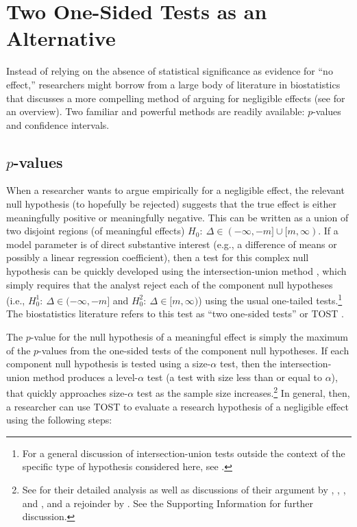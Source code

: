 \documentclass[12pt]{article}
\begin{document}
\section*{Two One-Sided Tests as an Alternative}

Instead of relying on the absence of statistical significance as evidence for ``no effect,'' researchers might borrow from a large body of literature in biostatistics that discusses a more compelling method of arguing for negligible effects (see \citealt{Wellek2010} for an overview). Two familiar and powerful methods are readily available: $p$-values and confidence intervals.

\subsection*{$p$-values}

When a researcher wants to argue empirically for a negligible effect, the relevant null hypothesis (to hopefully be rejected) suggests that the true effect is either meaningfully positive or meaningfully negative. This can be written as a union of two disjoint regions (of meaningful effects) $H_0:~\Delta \in (-\infty, -m] \cup [m, \infty)$. If a model parameter is of direct substantive interest (e.g., a difference of means or possibly a linear regression coefficient), then a test for this complex null hypothesis can be quickly developed using the intersection-union method \citep{Schuirmann1987, BergerHsu1996, Wellek2010}, which simply requires that the analyst reject each of the component null hypotheses (i.e., $H^1_0:~\Delta \in (-\infty, -m]$ and $H^2_0:~\Delta \in [m, \infty)$) using the usual one-tailed tests.\footnote{For a general discussion of intersection-union tests outside the context of the specific type of hypothesis considered here, see \citet[esp. pp. 380-382]{CasellaBerger2002}.} The biostatistics literature refers to this test as ``two one-sided tests'' or TOST \citep{Schuirmann1987, BergerHsu1996}.

The $p$-value for the null hypothesis of a meaningful effect is simply the maximum of the $p$-values from the one-sided tests of the component null hypotheses.  If each component null hypothesis is tested using a size-$\alpha$ test, then the intersection-union method produces a level-$\alpha$ test (a test with size less than or equal to $\alpha$), that quickly approaches size-$\alpha$ test as the sample size increases.\footnote{See \cite{BergerHsu1996} for their detailed analysis as well as discussions of their argument by \cite{MeredithHeise1996}, \cite{LiuChow1996}, \cite{Schuirmann1996}, and \cite{Hwang1996}, and a rejoinder by \cite{BergerHsu1996b}. See the Supporting Information for further discussion. } In general, then, a researcher can use TOST to evaluate a research hypothesis of a negligible effect using the following steps:
\end{document}

